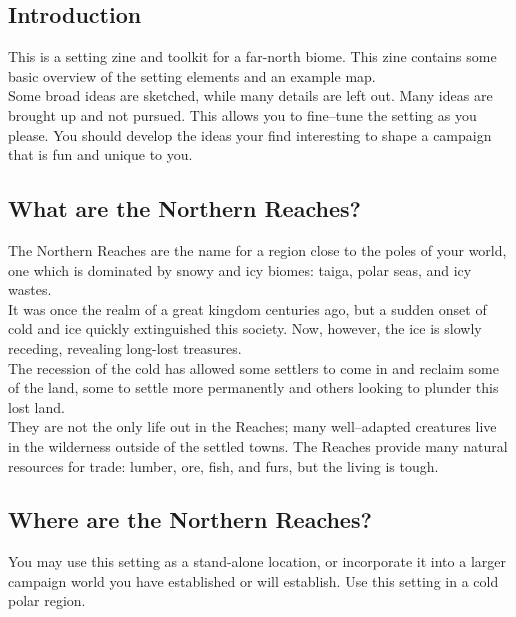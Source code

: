 \documentclass[notitlepage]{article}
\begin{document}
\begin{multicols*}{2}
  
\section{Introduction}

This is a setting zine and toolkit for a far-north biome.
This zine contains some basic overview of the setting elements and an example map. \\

Some broad ideas are sketched, while many details are left out.
Many ideas are brought up and not pursued.
This allows you to fine--tune the setting as you please.
You should develop the ideas your find interesting to shape a campaign that is fun and unique to you.

\subsection*{What are the Northern Reaches?}

The Northern Reaches are the name for a region close to the poles of your world, one which is dominated by snowy and icy biomes: taiga, polar seas, and icy wastes. \\

It was once the realm of a great kingdom centuries ago, but a sudden onset of cold and ice quickly extinguished this society.
Now, however, the ice is slowly receding, revealing long-lost treasures. \\

The recession of the cold has allowed some settlers to come in and reclaim some of the land, some to settle more permanently and others looking to plunder this lost land. \\

They are not the only life out in the Reaches; many well--adapted creatures live in the wilderness outside of the settled towns.
The Reaches provide many natural resources for trade: lumber, ore, fish, and furs, but the living is tough.

\subsection*{Where are the Northern Reaches?}

You may use this setting as a stand-alone location, or incorporate it into a larger campaign world you have established or will establish.
Use this setting in a cold polar region.


\end{multicols*}
\end{document}
